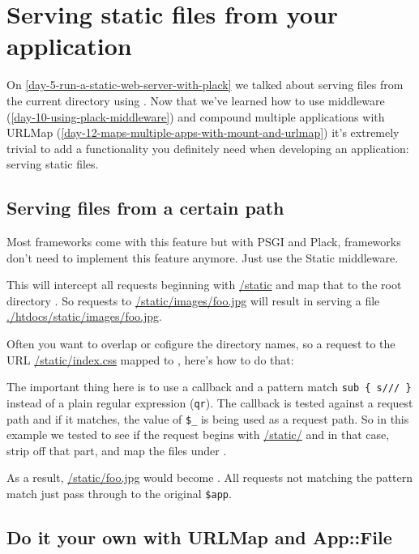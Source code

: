 \chapter{Serving static files from your application}
\label{day-17-serving-static-files-from-your-application}

On \autoref{day-5-run-a-static-web-server-with-plack} we talked about 
serving files from the current directory using
. Now that we've learned how to use middleware 
(\autoref{day-10-using-plack-middleware}) and compound multiple applications 
with URLMap (\autoref{day-12-maps-multiple-apps-with-mount-and-urlmap}) 
it's extremely trivial to add a functionality you definitely need when
developing an application: serving static files.

\section{Serving files from a certain
path}\label{serving-files-from-a-certain-path}

Most frameworks come with this feature but with PSGI and Plack,
frameworks don't need to implement this feature anymore. Just use the
Static middleware.


This will intercept all requests beginning with \url{/static} and map that
to the root directory . So requests to
\url{/static/images/foo.jpg} will result in serving a file
\url{./htdocs/static/images/foo.jpg}.

Often you want to overlap or cofigure the directory names, so a request
to the URL \url{/static/index.css} mapped to ,
here's how to do that:


The important thing here is to use a callback and a pattern match
\lstinline!sub { s/// }! instead of a plain regular expression
(\lstinline!qr!). The callback is tested against a request path and if
it matches, the value of \lstinline!$_! is being used as a request path.
So in this example we tested to see if the request begins with
\url{/static/} and in that case, strip off that part, and map the files
under .

As a result, \url{/static/foo.jpg} would become
. All requests not matching the pattern match
just pass through to the original \lstinline!$app!.

\section{Do it your own with URLMap and
App::File}\label{do-it-your-own-with-urlmap-and-appfile}

